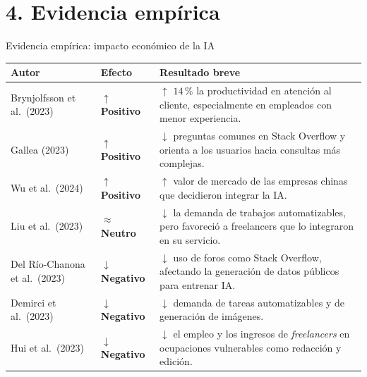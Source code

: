 \documentclass[10pt,aspectratio=169]{beamer}
\begin{document}
\section{4. Evidencia empírica}

\begin{frame}{Evidencia empírica: impacto económico de la IA}
\vspace{0.2em}
\renewcommand{\arraystretch}{1.30}
\centering
\footnotesize
\begin{tabular}{p{3.5cm}p{2.2cm}p{8cm}}
\toprule
\textbf{Autor} & \textbf{Efecto} & \textbf{Resultado breve} \\
\midrule
Brynjolfsson et al.\ (2023) & \textcolor{green!45!black}{$\uparrow$ \textbf{Positivo}} & $\uparrow$ $14\,\%$ la productividad en atención al cliente, especialmente en empleados con menor experiencia. \\
Gallea (2023) & \textcolor{green!45!black}{$\uparrow$ \textbf{Positivo}} & $\downarrow$ preguntas comunes en Stack Overflow y orienta a los usuarios hacia consultas más complejas. \\
Wu et al.\ (2024) & \textcolor{green!45!black}{$\uparrow$ \textbf{Positivo}} & $\uparrow$ valor de mercado de las empresas chinas que decidieron integrar la IA. \\
Liu et al.\ (2023) & \textcolor{orange!75!black}{$\approx$ \textbf{Neutro}} & $\downarrow$ la demanda de trabajos automatizables, pero favoreció a freelancers que lo integraron en su servicio. \\
Del Río-Chanona et al.\ (2023) & \textcolor{pucpaccent}{$\downarrow$ \textbf{Negativo}} & $\downarrow$ uso de foros como Stack Overflow, afectando la generación de datos públicos para entrenar IA. \\
Demirci et al.\ (2023) & \textcolor{pucpaccent}{$\downarrow$ \textbf{Negativo}} & $\downarrow$ demanda de tareas automatizables y de generación de imágenes. \\
Hui et al.\ (2023) & \textcolor{pucpaccent}{$\downarrow$ \textbf{Negativo}} & $\downarrow$ el empleo y los ingresos de \textit{freelancers} en ocupaciones vulnerables como redacción y edición. \\
\bottomrule
\end{tabular}
\end{frame}
\end{document}
